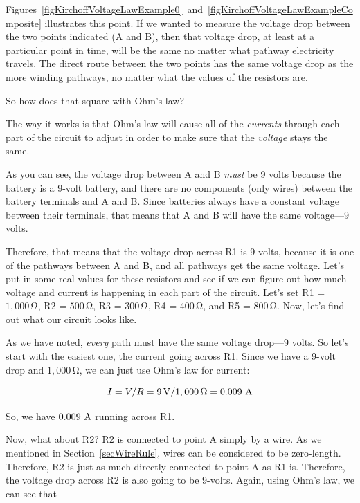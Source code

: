Figures~\ref{figKirchoffVoltageLawExample0}~and~\ref{figKirchoffVoltageLawExampleComposite} illustrates this point.
If we wanted to measure the voltage drop between the two points indicated (A and B), then that voltage drop, at least at a particular point in time, will be the same no matter what pathway electricity travels.
The direct route between the two points has the same voltage drop as the more winding pathways, no matter what the values of the resistors are.


So how does that square with Ohm's law?

The way it works is that Ohm's law will cause all of the \emph{currents} through each part of the circuit to adjust in order to make sure that the \emph{voltage} stays the same.

As you can see, the voltage drop between A and B \emph{must} be 9 volts because the battery is a 9-volt battery, and there are no components (only wires) between the battery terminals and A and B.
Since batteries always have a constant voltage between their terminals, that means that A and B will have the same voltage---9 volts.

Therefore, that means that the voltage drop across R1 is 9 volts, because it is one of the pathways between A and B, and all pathways get the same voltage.
Let's put in some real values for these resistors and see if we can figure out how much voltage and current is happening in each part of the circuit.
Let's set R1 = $1,000\,\si{\ohm}$, R2 = $500\,\si{\ohm}$, R3 = $300\,\si{\ohm}$, R4 = $400\,\si{\ohm}$, and R5 = $800\,\si{\ohm}$.
Now, let's find out what our circuit looks like.

As we have noted, \emph{every} path must have the same voltage drop---9 volts.
So let's start with the easiest one, the current going across R1.
Since we have a 9-volt drop and $1,000\,\si{\ohm}$, we can just use Ohm's law for current: 

$$I = V / R = 9\,\si{\volt} / 1,000\,\si{\ohm} = 0.009\,\,\si{\ampere}$$

So, we have $0.009\,\,\si{\ampere}$ running across R1.

Now, what about R2?
R2 is connected to point A simply by a wire.
As we mentioned in Section~\ref{secWireRule}, wires can be considered to be zero-length.
Therefore, R2 is just as much directly connected to point A as R1 is.
Therefore, the voltage drop across R2 is also going to be 9-volts.
Again, using Ohm's law, we can see that 

